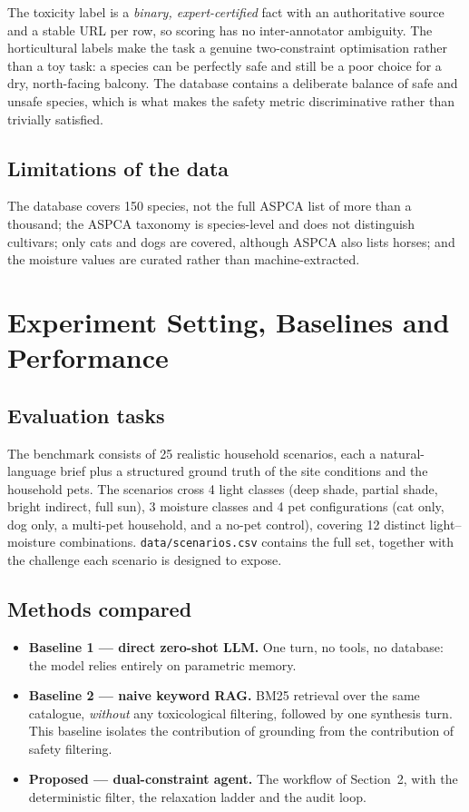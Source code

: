 \documentclass[12pt,a4paper]{article}
\begin{document}
The toxicity label is a \emph{binary, expert-certified} fact with an
authoritative source and a stable URL per row, so scoring has no
inter-annotator ambiguity. The horticultural labels make the task a genuine
two-constraint optimisation rather than a toy task: a species can be perfectly
safe and still be a poor choice for a dry, north-facing balcony. The database
contains a deliberate balance of safe and unsafe species, which is what makes
the safety metric discriminative rather than trivially satisfied.

\subsection{Limitations of the data}

The database covers 150 species, not the full ASPCA list of more than a
thousand; the ASPCA taxonomy is species-level and does not distinguish
cultivars; only cats and dogs are covered, although ASPCA also lists horses;
and the moisture values are curated rather than machine-extracted.

\section{Experiment Setting, Baselines and Performance}

\subsection{Evaluation tasks}

The benchmark consists of 25 realistic household scenarios, each a
natural-language brief plus a structured ground truth of the site conditions
and the household pets. The scenarios cross 4 light classes (deep shade,
partial shade, bright indirect, full sun), 3 moisture classes and 4 pet
configurations (cat only, dog only, a multi-pet household, and a no-pet
control), covering 12 distinct light--moisture combinations.
\texttt{data/scenarios.csv} contains the full set, together with the
challenge each scenario is designed to expose.

\subsection{Methods compared}

\begin{itemize}
  \item \textbf{Baseline 1 --- direct zero-shot LLM.} One turn, no tools, no
    database: the model relies entirely on parametric memory.
  \item \textbf{Baseline 2 --- naive keyword RAG.} BM25 retrieval over the
    same catalogue, \emph{without} any toxicological filtering, followed by
    one synthesis turn. This baseline isolates the contribution of grounding
    from the contribution of safety filtering.
  \item \textbf{Proposed --- dual-constraint agent.} The workflow of
    Section~2, with the deterministic filter, the relaxation ladder and the
    audit loop.
\end{itemize}
\end{document}
